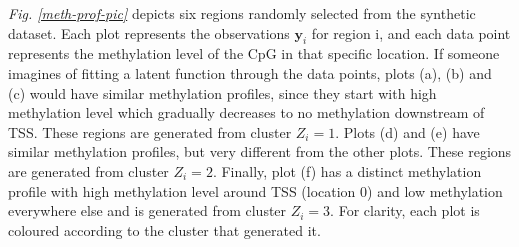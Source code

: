 \emph{Fig. \ref{meth-prof-pic}} depicts six regions randomly selected from the synthetic dataset. Each plot represents the observations $\mathbf{y}_{i}$ for region i, and each data point represents the methylation level of the CpG in that specific location. If someone imagines of fitting a latent function through the data points, plots (a), (b) and (c) would have similar methylation profiles, since they start with high methylation level which gradually decreases to no methylation downstream of TSS. These regions are generated from cluster $Z_{i}=1$. Plots (d) and (e) have similar methylation profiles, but very different from the other plots. These regions are generated from cluster $Z_{i}=2$. Finally, plot (f) has a distinct methylation profile with high methylation level around TSS (\ie location 0) and low methylation everywhere else and is generated from cluster $Z_{i}=3$. For clarity, each plot is coloured according to the cluster that generated it.
